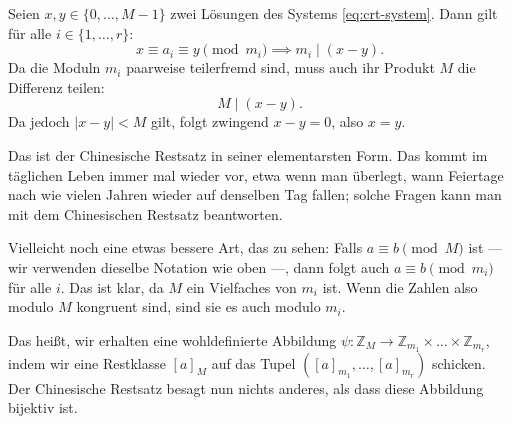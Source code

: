 \begin{math-stroke}
\begin{short-proof}
Seien $x, y \in \{0, \dots, M-1\}$ zwei Lösungen des Systems \eqref{eq:crt-system}. Dann gilt für alle $i \in \{1, \dots, r\}$:
\[
x \equiv a_i \equiv y \pmod{m_i} \implies m_i \mid (x - y).
\]
Da die Moduln $m_i$ paarweise teilerfremd sind, muss auch ihr Produkt $M$ die Differenz teilen:
\[
M \mid (x - y).
\]
Da jedoch $|x - y| < M$ gilt, folgt zwingend $x - y = 0$, also $x = y$.
\end{short-proof}
\end{math-stroke}

\begin{spoken-clean}[01:12:09 - 01:14:09]
Das ist der Chinesische Restsatz in seiner elementarsten Form. Das kommt im täglichen Leben immer mal wieder vor, etwa wenn man überlegt, wann Feiertage nach wie vielen Jahren wieder auf denselben Tag fallen; solche Fragen kann man mit dem Chinesischen Restsatz beantworten.

Vielleicht noch eine etwas bessere Art, das zu sehen: Falls $a \equiv b \pmod M$ ist --- wir verwenden dieselbe Notation wie oben ---, dann folgt auch $a \equiv b \pmod{m_i}$ für alle $i$. Das ist klar, da $M$ ein Vielfaches von $m_i$ ist. Wenn die Zahlen also modulo $M$ kongruent sind, sind sie es auch modulo $m_i$.

Das heißt, wir erhalten eine wohldefinierte Abbildung $\psi \colon \mathbb{Z}_M \to \mathbb{Z}_{m_1} \times \dots \times \mathbb{Z}_{m_r}$, indem wir eine Restklasse $[a]_M$ auf das Tupel $([a]_{m_1}, \dots, [a]_{m_r})$ schicken. Der Chinesische Restsatz besagt nun nichts anderes, als dass diese Abbildung bijektiv ist.
\end{spoken-clean}

